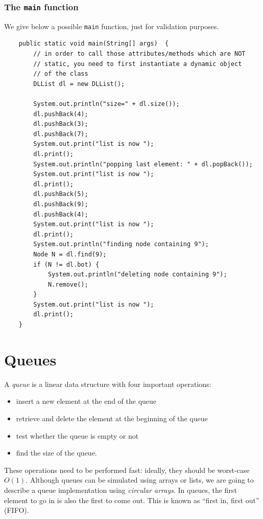 \documentclass[a4paper]{book}
\theoremstyle{changebreak}                %
\begin{document}
\subsubsection{The {\tt main} function}
We give below a possible {\tt main} function, just for validation
purposes.
{\small
\begin{verbatim}
    public static void main(String[] args)  {
        // in order to call those attributes/methods which are NOT
        // static, you need to first instantiate a dynamic object
        // of the class
        DLList dl = new DLList();

        System.out.println("size=" + dl.size());
        dl.pushBack(4);
        dl.pushBack(3);
        dl.pushBack(7);
        System.out.print("list is now "); 
        dl.print();
        System.out.println("popping last element: " + dl.popBack());
        System.out.print("list is now "); 
        dl.print();
        dl.pushBack(5);
        dl.pushBack(9);
        dl.pushBack(4);
        System.out.print("list is now "); 
        dl.print();
        System.out.println("finding node containing 9");
        Node N = dl.find(9);
        if (N != dl.bot) {
            System.out.println("deleting node containing 9");
            N.remove();
        }
        System.out.print("list is now "); 
        dl.print();
    }
\end{verbatim}
}

\section{Queues}
\label{s:linear:queue}
A {\it queue} is a linear data structure with four
important operations:
\begin{itemize}
\item insert a new element at the end of the
  queue
\item retrieve and delete
  the element at the beginning of the queue
\item test whether the queue is empty or not
\item find the size of the queue.
\end{itemize} 
These operations need to be performed fast: ideally, they should be
worst-case $O(1)$. Although queues can be simulated using arrays or
lists, we are going to describe a queue implementation using {\it
  circular arrays}. In
queues, the first element to go in is also the first to come out. This
is known as ``first in, first out'' (FIFO).
\end{document}
